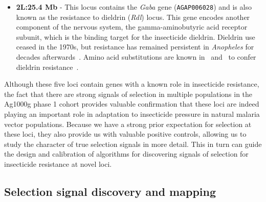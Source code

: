\begin{refsection}
\begin{itemize}
\item \textbf{2L:25.4 Mb} - This locus contains the \textit{Gaba} gene (\texttt{AGAP006028}) and is also known as the resistance to dieldrin (\textit{Rdl}) locus.
%
This gene encodes another component of the nervous system,  the gamma-aminobutyric acid receptor subunit, which is the binding target for the insecticide dieldrin.
%
Dieldrin use ceased in the 1970s, but resistance has remained persistent in \textit{Anopheles} for decades afterwards~\parencite{Du2005}.
%
Amino acid substitutions are known in \agam\ and \acol\ to confer dieldrin resistance~\parencite{Du2005,Lawniczak2010}.
\end{itemize}


Although these five loci contain genes with a known role in insecticide resistance, the fact that there are strong signals of selection in multiple populations in the Ag1000g phase 1 cohort provides valuable confirmation that these loci are indeed playing an important role in adaptation to insecticide pressure in natural malaria vector populations.
%
Because we have a strong prior expectation for selection at these loci, they also provide us with valuable positive controls, allowing us to study the character of true selection signals in more detail.
%
This in turn can guide the design and calibration of algorithms for discovering signals of selection for insecticide resistance at novel loci.


\subsection{Selection signal discovery and mapping}\label{subsec:signal-discovery}



\end{refsection}
